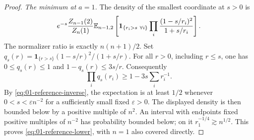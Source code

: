 \begin{proof}
\smallskip\noindent\emph{The minimum at $a=1$.}
The density of the smallest coordinate at $s>0$ is
\[
 e^{-s}\frac{Z_{n-1}(2)}{Z_n(1)}
 \mathbb E_{n-1,2}\left[
    \mathbf1_{\{r_i>s\ \forall i\}}
    \prod_i\frac{(1-s/r_i)^2}{1+s/r_i}\right].
\]
The normalizer ratio is exactly $n(n+1)/2$.
Set $q_s(r)=\mathbf1_{\{r>s\}}(1-s/r)^2/(1+s/r)$.
For all $r>0$, including $r\le s$, one has
$0\le q_s(r)\le1$ and $1-q_s(r)\le3s/r$. Consequently
\[
 \prod_iq_s(r_i)\ge1-3s\sum_i r_i^{-1}.
\]
By \eqref{eq:01-reference-inverse}, the expectation is at least
$1/2$ whenever $0<s<\varepsilon n^{-2}$ for a sufficiently small
fixed $\varepsilon>0$. The displayed density is then bounded below
by a positive multiple of $n^2$. An interval with endpoints fixed
positive multiples of $n^{-2}$ has probability bounded below;
on it $r_1^{-1/4}\gtrsim n^{1/2}$. This proves
\eqref{eq:01-reference-lower}, with $n=1$ also covered directly.
\end{proof}

